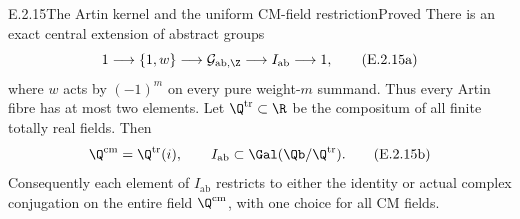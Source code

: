 \begin{result}{E.2.15}{The Artin kernel and the uniform CM-field restriction}{Proved}
There is an exact central extension of abstract groups
\[
 1\longrightarrow\{1,w\}\longrightarrow
 \mathcal G_{\mathrm{ab},\Z}\longrightarrow I_{\mathrm{ab}}
 \longrightarrow1,
 \tag{E.2.15a}
\]
where \(w\) acts by \((-1)^m\) on every pure weight-\(m\)
summand. Thus every Artin fibre has at most two elements.
Let \(\Q^{\mathrm{tr}}\subset\R\) be the compositum of all
finite totally real fields. Then
\[
 \Q^{\mathrm{cm}}=\Q^{\mathrm{tr}}(i),\qquad
 I_{\mathrm{ab}}\subset\Gal(\Qb/\Q^{\mathrm{tr}}).
 \tag{E.2.15b}
\]
Consequently each element of \(I_{\mathrm{ab}}\) restricts to
either the identity or actual complex conjugation on the entire
field \(\Q^{\mathrm{cm}}\), with one choice for all CM fields.
\end{result}
